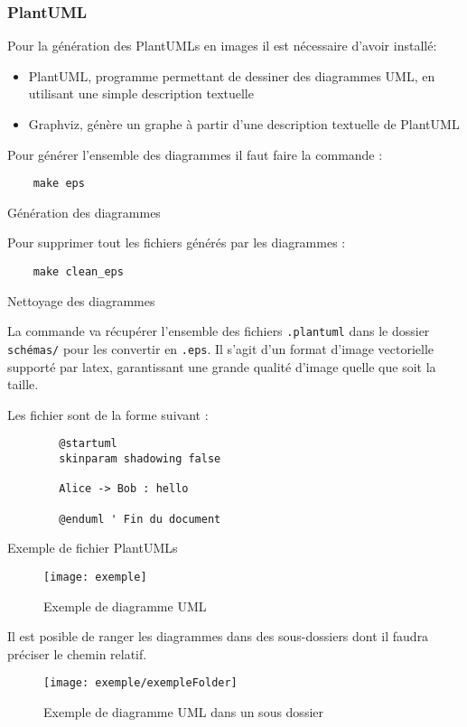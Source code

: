 \subsubsection{PlantUML}
Pour la génération des PlantUMLs en images il est nécessaire d'avoir installé:
\begin{itemize}
    \item PlantUML, programme permettant de dessiner des diagrammes UML, en utilisant une simple description textuelle
    \item Graphviz, génère un graphe à partir d'une description textuelle de PlantUML
\end{itemize}

Pour générer l'ensemble des diagrammes il faut faire la commande :
\begin{code}
    \begin{verbatim}
    make eps
\end{verbatim}
    \caption{Génération des diagrammes}
\end{code}

Pour supprimer tout les fichiers générés par les diagrammes :
\begin{code}
    \begin{verbatim}
    make clean_eps
\end{verbatim}
    \caption{Nettoyage des diagrammes}
\end{code}

La commande va récupérer l'ensemble des fichiers \verb=.plantuml=
dans le dossier \verb=schémas/= pour les convertir en \verb=.eps=.
Il s'agit d'un format d'image vectorielle supporté par \gls{latex},
garantissant une grande qualité d'image quelle que soit la taille.

Les fichier sont de la forme suivant :
\begin{code}
    \begin{verbatim}
        @startuml
        skinparam shadowing false

        Alice -> Bob : hello

        @enduml ' Fin du document
    \end{verbatim}
    \caption{Exemple de fichier PlantUMLs}
\end{code}

\begin{figure}[H]
    \centering
    \texttt{[image: exemple]}
    \caption{Exemple de diagramme UML}
\end{figure}

Il est posible de ranger les diagrammes dans des sous-dossiers dont il faudra préciser le chemin relatif.
\begin{figure}[H]
    \centering
    \texttt{[image: exemple/exempleFolder]}
    \caption{Exemple de diagramme UML dans un sous dossier }
\end{figure}

